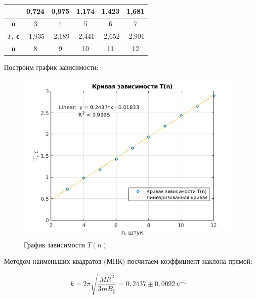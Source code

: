 \begin{table}[h!]
    \centering
    \begin{tabular}{|c|c|c|c|c|c|}
    \hline
    \cellcolor[HTML]{FFFFFF}{\color[HTML]{000000} \textbf{$T$, с}} & \multicolumn{1}{r|}{0,724} & \multicolumn{1}{r|}{0,975} & \multicolumn{1}{r|}{1,174} & \multicolumn{1}{r|}{1,423} & \multicolumn{1}{r|}{1,681} \\ \hline
    \textbf{n}                                                     & 3                          & 4                          & 5                          & 6                          & 7                          \\ \hline
    \cellcolor[HTML]{FFFFFF}\textbf{$T$, с}                        & \multicolumn{1}{r|}{1,935} & \multicolumn{1}{r|}{2,189} & \multicolumn{1}{r|}{2,441} & \multicolumn{1}{r|}{2,652} & \multicolumn{1}{r|}{2,901} \\ \hline
    \textbf{n}                                                     & 8                          & 9                          & 10                         & 11                         & 12                         \\ \hline
    \end{tabular}
\end{table}

Построим график зависимости:

\begin{figure}[h]
    \centering
    \includegraphics[width = 10 cm]{images/tn.png}
    \caption{График зависимости $T(n)$}
    \label{tn}
\end{figure}

Методом наименьших квадратов (МНК) посчитаем коэффициент наклона прямой: 

\begin{equation}
    k = 2 \pi \sqrt{\frac{M R^2}{3 m B_{||}}} = 0,2437 \pm 0,0092 \; \text{с}^{-1}
\end{equation}

